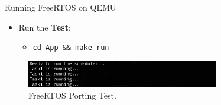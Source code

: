 \begin{frame}[fragile]{Running FreeRTOS on QEMU}
    \begin{itemize}
        \item Run the \textbf{Test}:
            \begin{itemize}
                \item \texttt{cd App \&\& make run}
            \end{itemize}
    \end{itemize}
    \begin{figure}[h]
        \centering
        \includegraphics[width=0.75\textwidth]{images/freertos_porting.png}
        \caption{FreeRTOS Porting Test.}
    \end{figure}
\end{frame}
